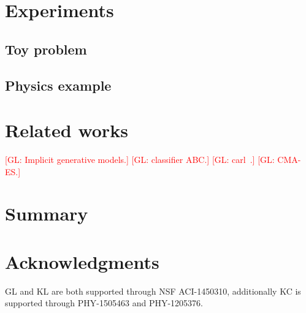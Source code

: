 \documentclass[twocolumn,superscriptaddress,aps]{revtex4-1}
\newcommand{\glnote}[1]{\textcolor{red}{[GL: #1]}}
\theoremstyle{plain}
\begin{document}

\section{Experiments}

\subsection{Toy problem}

\subsection{Physics example}



\section{Related works}


\glnote{Implicit generative models.}
\glnote{classifier ABC.}
\glnote{carl~\citep{cranmer2015approximating}.}
\glnote{CMA-ES.}



\section{Summary}




\section*{Acknowledgments}

GL and KL are both supported through NSF ACI-1450310, additionally KC is
supported through PHY-1505463 and PHY-1205376.





\end{document}

